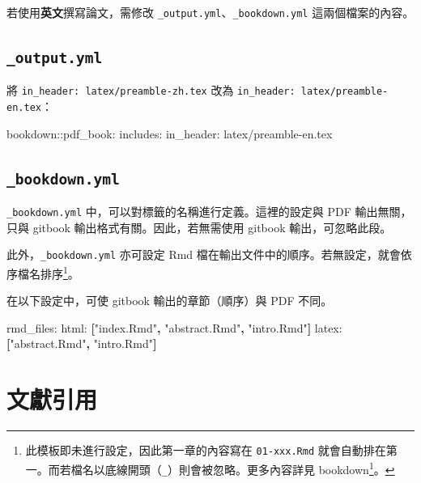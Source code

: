 \documentclass[oneside]{book}
\newenvironment{Shaded}{\begin{snugshade}}{\end{snugshade}}
\newcommand{\KeywordTok}[1]{\textcolor[rgb]{0.13,0.29,0.53}{\textbf{#1}}}
\newcommand{\StringTok}[1]{\textcolor[rgb]{0.31,0.60,0.02}{#1}}
\newcommand{\FunctionTok}[1]{\textcolor[rgb]{0.00,0.00,0.00}{#1}}
\newcommand{\AttributeTok}[1]{\textcolor[rgb]{0.77,0.63,0.00}{#1}}
\renewcommand{\href}[2]{#2\footnote{\url{#1}}}
\theoremstyle{definition}
\theoremstyle{definition}
\theoremstyle{definition}
\theoremstyle{remark}
\begin{document}
若使用\textbf{英文}撰寫論文，需修改
\texttt{\_output.yml}、\texttt{\_bookdown.yml} 這兩個檔案的內容。

\subsection{\texorpdfstring{\texttt{\_output.yml}}{\_output.yml}}\label{output.yml}

將 \texttt{in\_header:\ latex/preamble-zh.tex} 改為
\texttt{in\_header:\ latex/preamble-en.tex}：

\begin{Shaded}
\begin{Highlighting}[]
\FunctionTok{bookdown:}\AttributeTok{:pdf_book:}
  \FunctionTok{includes:}
    \FunctionTok{in_header:}\AttributeTok{ latex/preamble-en.tex}
\end{Highlighting}
\end{Shaded}

\subsection{\texorpdfstring{\texttt{\_bookdown.yml}}{\_bookdown.yml}}\label{bookdown.yml}

\texttt{\_bookdown.yml} 中，可以對標籤的名稱進行定義。這裡的設定與 PDF
輸出無關，只與 gitbook 輸出格式有關。因此，若無需使用 gitbook
輸出，可忽略此段。

此外，\texttt{\_bookdown.yml} 亦可設定 Rmd
檔在輸出文件中的順序。若無設定，就會依序檔名排序\footnote{此模板即未進行設定，因此第一章的內容寫在
  \texttt{01-xxx.Rmd}
  就會自動排在第一。而若檔名以底線開頭（\texttt{\_}）則會被忽略。更多內容詳見
  \href{https://bookdown.org/yihui/bookdown/usage.html}{bookdown}。}。

在以下設定中，可使 gitbook 輸出的章節（順序）與 PDF 不同。

\begin{Shaded}
\begin{Highlighting}[]
\FunctionTok{rmd_files:}
  \FunctionTok{html:}\AttributeTok{ }\KeywordTok{[}\StringTok{"index.Rmd"}\KeywordTok{,} \StringTok{"abstract.Rmd"}\KeywordTok{,} \StringTok{"intro.Rmd"}\KeywordTok{]}
  \FunctionTok{latex:}\AttributeTok{ }\KeywordTok{[}\StringTok{"abstract.Rmd"}\KeywordTok{,} \StringTok{"intro.Rmd"}\KeywordTok{]}
\end{Highlighting}
\end{Shaded}

\section{文獻引用}\label{bib-cite}
\end{document}
